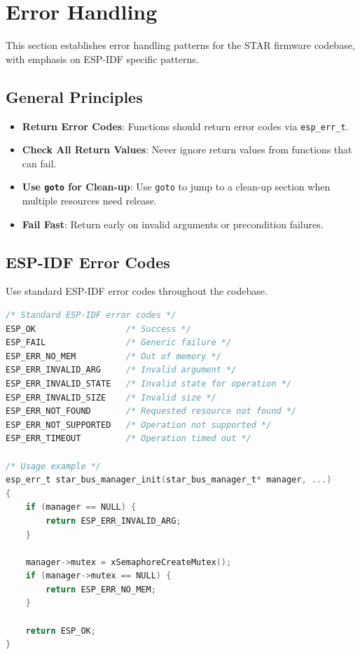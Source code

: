 \section{Error Handling}

This section establishes error handling patterns for the STAR firmware codebase, with emphasis on ESP-IDF specific patterns.

\subsection{General Principles}

\begin{itemize}
    \item \textbf{Return Error Codes}: Functions should return error codes via \texttt{esp\_err\_t}.
    \item \textbf{Check All Return Values}: Never ignore return values from functions that can fail.
    \item \textbf{Use \texttt{goto} for Clean-up}: Use \texttt{goto} to jump to a clean-up section when multiple resources need release.
    \item \textbf{Fail Fast}: Return early on invalid arguments or precondition failures.
\end{itemize}

\subsection{ESP-IDF Error Codes}

Use standard ESP-IDF error codes throughout the codebase.

\begin{lstlisting}[language=C]
/* Standard ESP-IDF error codes */
ESP_OK                  /* Success */
ESP_FAIL                /* Generic failure */
ESP_ERR_NO_MEM          /* Out of memory */
ESP_ERR_INVALID_ARG     /* Invalid argument */
ESP_ERR_INVALID_STATE   /* Invalid state for operation */
ESP_ERR_INVALID_SIZE    /* Invalid size */
ESP_ERR_NOT_FOUND       /* Requested resource not found */
ESP_ERR_NOT_SUPPORTED   /* Operation not supported */
ESP_ERR_TIMEOUT         /* Operation timed out */

/* Usage example */
esp_err_t star_bus_manager_init(star_bus_manager_t* manager, ...)
{
    if (manager == NULL) {
        return ESP_ERR_INVALID_ARG;
    }

    manager->mutex = xSemaphoreCreateMutex();
    if (manager->mutex == NULL) {
        return ESP_ERR_NO_MEM;
    }

    return ESP_OK;
}
\end{lstlisting}

